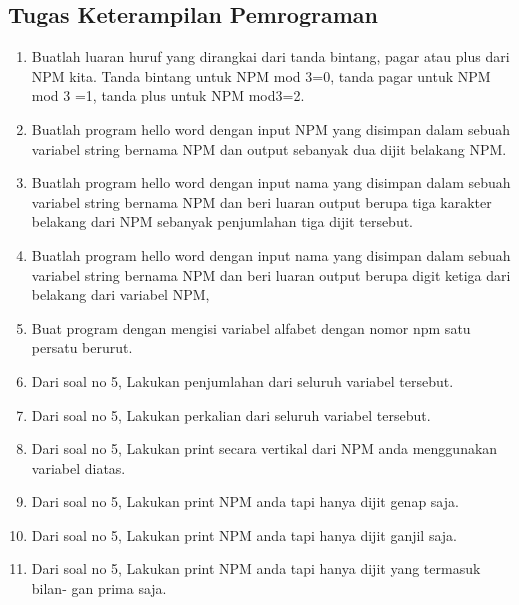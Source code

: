 \subsection{Tugas Keterampilan Pemrograman}
\begin{enumerate}
\item Buatlah luaran huruf yang dirangkai dari tanda bintang, pagar atau plus dari
    NPM kita. Tanda bintang untuk NPM mod 3=0, tanda pagar untuk NPM mod
    3 =1, tanda plus untuk NPM mod3=2.
    

\item Buatlah program hello word dengan input NPM yang disimpan dalam sebuah
    variabel string bernama NPM dan output sebanyak dua dijit belakang NPM.
    
    
\item Buatlah program hello word dengan input nama yang disimpan dalam sebuah
    variabel string bernama NPM dan beri luaran output berupa tiga karakter
    belakang dari NPM sebanyak penjumlahan tiga dijit tersebut.
    

\item Buatlah program hello word dengan input nama yang disimpan dalam sebuah
    variabel string bernama NPM dan beri luaran output berupa digit ketiga dari
    belakang dari variabel NPM,
    

\item Buat program dengan mengisi variabel alfabet
    dengan nomor npm satu persatu berurut.
    

\item Dari soal no 5, Lakukan penjumlahan dari seluruh variabel tersebut.
    

\item Dari soal no 5, Lakukan perkalian dari seluruh variabel tersebut.
    

\item Dari soal no 5, Lakukan print secara vertikal dari NPM anda menggunakan
    variabel diatas.
    

\item Dari soal no 5, Lakukan print NPM anda tapi hanya dijit genap saja.
    

\item Dari soal no 5, Lakukan print NPM anda tapi hanya dijit ganjil saja.
    

\item Dari soal no 5, Lakukan print NPM anda tapi hanya dijit yang termasuk bilan-
    gan prima saja.
    

\end{enumerate}

